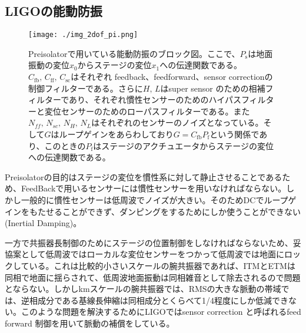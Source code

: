 \documentclass[a4paper,12pt]{jsarticle}
\begin{document}
\subsection{LIGOの能動防振}
\begin{figure}[H]
  \begin{center}
    \texttt{[image: ./img\_2dof\_pi.png]}
  \end{center}
  \caption{Preisolatorで用いている能動防振のブロック図。ここで、$P_{\mathrm{s}}$は地面振動の変位$x_0$からステージの変位$x_1$への伝達関数である。$C_{\mathrm{fb}},\,C_{\mathrm{ff}},\,C_{\mathrm{sc}}$はそれぞれ feedback、feedforward、sensor correctionの制御フィルターである。さらに$H,\,L$はsuper sensor のための相補フィルターであり、それぞれ慣性センサーのためのハイパスフィルターと変位センサーのためのローパスフィルターである。また$N_{ff},\,N_{sc},\,N_{H},\,N_{L}$はそれぞれのセンサーのノイズとなっている。そして$G$はループゲインをあらわしており$G=C_{\mathrm{fb}}P_{\mathrm{f}}$という関係であり、このときの$P_{\mathrm{f}}$はステージのアクチュエータからステージの変位への伝達関数である。}\label{img:img_2dof_pi}
\end{figure}

Preisolatorの目的はステージの変位を慣性系に対して静止させることであるため、FeedBackで用いるセンサーには慣性センサーを用いなければならない。しかし一般的に慣性センサーは低周波でノイズが大きい。そのためDCでループゲインをもたせることができず、ダンピングをするためにしか使うことができない(Inertial Damping)。

一方で共振器長制御のためにステージの位置制御をしなければならないため、妥協案として低周波ではローカルな変位センサーをつかって低周波では地面にロックしている。これは比較的小さいスケールの腕共振器であれば、ITMとETMは同相で地面に揺らされて、低周波地面振動は同相雑音として除去されるので問題とならない。しかしkmスケールの腕共振器では、RMSの大きな脈動の帯域では、逆相成分である基線長伸縮は同相成分とくらべて1/4程度にしか低減できない。このような問題を解決するためにLIGOではsensor correction と呼ばれるfeed forward 制御を用いて脈動の補償をしている。
\end{document}
